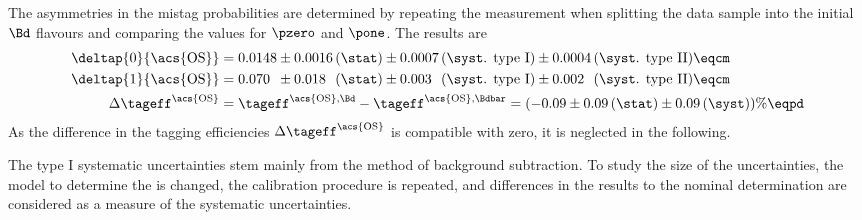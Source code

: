 %
The asymmetries in the mistag probabilities are determined by repeating the
measurement when splitting the data sample into the initial $\Bd$ flavours and
comparing the values for $\pzero$ and $\pone$. The results \cite{Aaij:2015vza}
are
%
\begin{equation*}\label{eq:flavour_tagging:calibration:os:asymmetries}
  \begin{split}
    \deltap{0}{\text{\acs{OS}}} &= 0.0148 \pm 0.0016 \text{\,(\stat)} \pm  0.0007 \text{\,(\syst. type I)} \pm  0.0004 \text{\,(\syst. type II)} \eqcm \\ %
    \deltap{1}{\text{\acs{OS}}} &= 0.070\phantom{0} \pm 0.018\phantom{0} \text{\,(\stat)} \pm 0.003\phantom{0} \text{\,(\syst. type I)} \pm 0.002\phantom{0} \text{\,(\syst. type II)} \eqcm \\ %
    \Delta \tageff^{\text{\acs{OS}}} &= \tageff^{\text{\acs{OS},\Bd}} - \tageff^{\text{\acs{OS},\Bdbar}} = (-0.09  \pm 0.09 \text{\,(\stat)} \pm   0.09 \text{\,(\syst)})\% \eqpd
  \end{split}
\end{equation*}
%
As the difference in the tagging efficiencies $\Delta \tageff^{\text{\acs{OS}}}$
is compatible with zero, it is neglected in the following.

The type I systematic uncertainties stem mainly from the method of background
subtraction. To study the size of the uncertainties, the model to determine the
\sweights is changed, the calibration procedure is repeated, and differences in
the results to the nominal determination are considered as a measure of the
systematic uncertainties.

